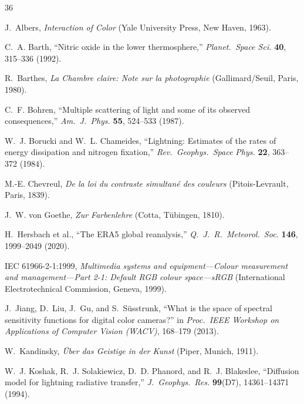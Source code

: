 \documentclass[11pt,a4paper]{article}
\begin{document}
\begin{thebibliography}{36}

J.~Albers, \emph{Interaction of Color} (Yale University Press, New Haven,
1963).

C.~A. Barth, ``Nitric oxide in the lower thermosphere,'' \emph{Planet.\
Space Sci.} \textbf{40}, 315--336 (1992).

R.~Barthes, \emph{La Chambre claire: Note sur la photographie}
(Gallimard/Seuil, Paris, 1980).

C.~F. Bohren, ``Multiple scattering of light and some of its observed
consequences,'' \emph{Am.\ J.\ Phys.} \textbf{55}, 524--533 (1987).

W.~J. Borucki and W.~L. Chameides, ``Lightning: Estimates of the rates of
energy dissipation and nitrogen fixation,'' \emph{Rev.\ Geophys.\ Space
Phys.} \textbf{22}, 363--372 (1984).

M.-E. Chevreul, \emph{De la loi du contraste simultan\'e des couleurs}
(Pitois-Levrault, Paris, 1839).

J.~W. von Goethe, \emph{Zur Farbenlehre} (Cotta, T\"ubingen, 1810).

H.~Hersbach et al., ``The ERA5 global reanalysis,'' \emph{Q.\ J.\ R.\
Meteorol.\ Soc.} \textbf{146}, 1999--2049 (2020).

IEC 61966-2-1:1999, \emph{Multimedia systems and equipment---Colour
measurement and management---Part 2-1: Default RGB colour space---sRGB}
(International Electrotechnical Commission, Geneva, 1999).

J.~Jiang, D.~Liu, J.~Gu, and S.~S\"usstrunk, ``What is the space of spectral
sensitivity functions for digital color cameras?'' in \emph{Proc.\ IEEE
Workshop on Applications of Computer Vision (WACV)}, 168--179 (2013).

\bibitem[Kandinsky(1911)]{kandinsky1911}
W.~Kandinsky, \emph{\"Uber das Geistige in der Kunst} (Piper, Munich, 1911).

\bibitem[Koshak et al.(1994)]{koshak1994}
W.~J. Koshak, R.~J. Solakiewicz, D.~D. Phanord, and R.~J. Blakeslee,
``Diffusion model for lightning radiative transfer,'' \emph{J.\ Geophys.\
Res.} \textbf{99}(D7), 14361--14371 (1994).


\end{thebibliography}
\end{document}
